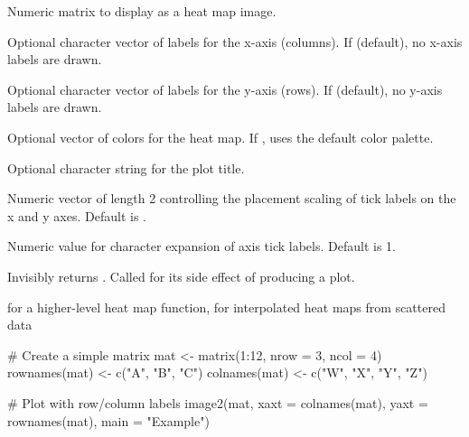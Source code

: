 \documentclass[a4paper]{book}
\begin{document}
\begin{Arguments}
\begin{ldescription}
\item[\code{mat}] Numeric matrix to display as a heat map image.

\item[\code{xaxt}] Optional character vector of labels for the x-axis (columns).
If  (default), no x-axis labels are drawn.

\item[\code{yaxt}] Optional character vector of labels for the y-axis (rows).
If  (default), no y-axis labels are drawn.

\item[\code{col}] Optional vector of colors for the heat map. If ,
uses the default  color palette.

\item[\code{main}] Optional character string for the plot title.

\item[\code{scale\_vec}] Numeric vector of length 2 controlling the placement scaling
of tick labels on the x and y axes. Default is .

\item[\code{cex.axis}] Numeric value for character expansion of axis tick labels.
Default is 1.
\end{ldescription}
\end{Arguments}
%
\begin{Value}
Invisibly returns . Called for its side effect of producing
a plot.
\end{Value}
%
\begin{SeeAlso}
 for a higher-level heat map function,
 for interpolated heat maps from scattered data
\end{SeeAlso}
%
\begin{Examples}
\begin{ExampleCode}
# Create a simple matrix
mat <- matrix(1:12, nrow = 3, ncol = 4)
rownames(mat) <- c("A", "B", "C")
colnames(mat) <- c("W", "X", "Y", "Z")

# Plot with row/column labels
image2(mat, xaxt = colnames(mat), yaxt = rownames(mat), main = "Example")

\end{ExampleCode}
\end{Examples}
\end{document}
